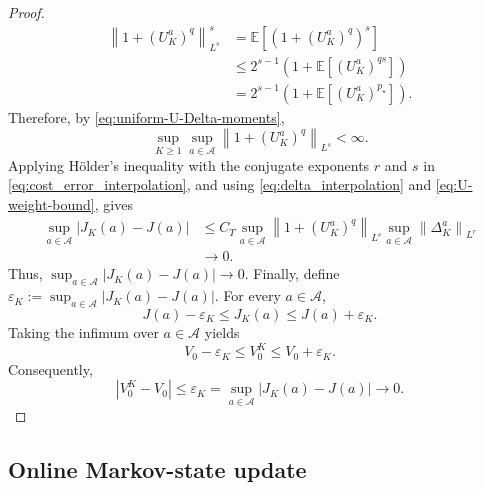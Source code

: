\documentclass[11pt]{article}
\theoremstyle{remarkitalic}
\theoremstyle{remarkitalic}
\newcommand{\E}{\mathbb E}
\newcommand{\1}{\mathbf 1}
\newcommand{\norm}[1]{\left\lVert #1 \right\rVert}
\newcommand{\abs}[1]{\left\lvert #1\right\rvert}
\begin{document}
{\begin{proof}
\begin{align*}
    \norm{1+(U_K^a)^q}_{L^s}^s
    &=
    \E\left[
        \left(
            1+(U_K^a)^q
        \right)^s
    \right]\\
    &\le
    2^{s-1}
    \left(
        1+\E\left[(U_K^a)^{qs}\right]
    \right)\\
    &=
    2^{s-1}
    \left(
        1+\E\left[(U_K^a)^{p_\star}\right]
    \right).
\end{align*}
Therefore, by \eqref{eq:uniform-U-Delta-moments},
\begin{equation}
\label{eq:U-weight-bound}
    \sup_{K\ge1}\sup_{a\in\mathcal A}
    \norm{1+(U_K^a)^q}_{L^s}
    <\infty.
\end{equation} Applying Hölder's inequality with the conjugate exponents $r$ and
$s$ in \eqref{eq:cost_error_interpolation}, and using
\eqref{eq:delta_interpolation} and \eqref{eq:U-weight-bound}, gives
\begin{align*}
    \sup_{a\in\mathcal A}
    \abs{J_K(a)-J(a)}
    &\le
    C_T
    \sup_{a\in\mathcal A}
    \norm{1+(U_K^a)^q}_{L^s}
    \sup_{a\in\mathcal A}
    \norm{\Delta_K^a}_{L^r}\\
    &\longrightarrow0.
\end{align*}
Thus, $\sup_{a\in\mathcal A}
    \abs{J_K(a)-J(a)}
    \longrightarrow0.$ Finally, define
$ \varepsilon_K
    :=
    \sup_{a\in\mathcal A}
    \abs{J_K(a)-J(a)}.
$
For every $a\in\mathcal A$,
\[
    J(a)-\varepsilon_K
    \le
    J_K(a)
    \le
    J(a)+\varepsilon_K.
\]
Taking the infimum over $a\in\mathcal A$ yields
\[
    V_0-\varepsilon_K
    \le
    V_0^K
    \le
    V_0+\varepsilon_K.
\]
Consequently,
\[
    \abs{V_0^K-V_0}
    \le
    \varepsilon_K
    =
    \sup_{a\in\mathcal A}
    \abs{J_K(a)-J(a)}
    \longrightarrow0.
\]
\end{proof}



}



\subsection{Online Markov-state update}\label{sec:onlinemarkov}
\end{document}
